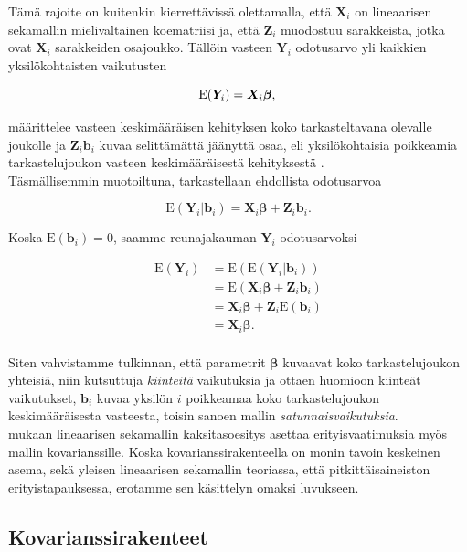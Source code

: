 \documentclass[finnish]{docopts}
\begin{document}
Tämä rajoite on kuitenkin kierrettävissä olettamalla, että $\bm{X}_i$ on lineaarisen sekamallin mielivaltainen koematriisi ja, että $\bm{Z}_i$ muodostuu sarakkeista, jotka ovat $\bm{X}_i$ sarakkeiden osajoukko. Tällöin vasteen $\bm{Y}_i$ odotusarvo yli kaikkien yksilökohtaisten vaikutusten

$$
\text{E}(\bm{Y}_i) = \bm{X}_i \bm{\beta}, \\
$$

määrittelee vasteen keskimääräisen kehityksen koko tarkasteltavana olevalle joukolle ja $\bm{Z}_i \bm{b}_i$ kuvaa selittämättä jäänyttä osaa, eli yksilökohtaisia poikkeamia tarkastelujoukon vasteen keskimääräisestä kehityksestä \cite{fitzmaurice11}. \\

Täsmällisemmin muotoiltuna, tarkastellaan ehdollista odotusarvoa

$$
\text{E}(\bm{Y}_i | \bm{b}_i) = \bm{X}_i \bm{\beta} + \bm{Z}_i \bm{b}_i.
$$

Koska $\text{E}(\bm{b}_i) = 0$, saamme reunajakauman $\bm{Y}_i$ odotusarvoksi

$$
\begin{aligned}
\text{E}(\bm{Y}_i) &=  \text{E}(\text{E}(\bm{Y}_i | \bm{b}_i)) \\
&=  \text{E}(\bm{X}_i \bm{\beta} + \bm{Z}_i \bm{b}_i) \\
&=  \bm{X}_i \bm{\beta} + \bm{Z}_i \text{E}(\bm{b}_i) \\
&=  \bm{X}_i \bm{\beta}. \\
\end{aligned}
$$

Siten vahvistamme tulkinnan, että parametrit $\bm{\beta}$ kuvaavat koko tarkastelujoukon yhteisiä, niin kutsuttuja \textit{kiinteitä} vaikutuksia ja ottaen huomioon kiinteät vaikutukset, $\bm{b}_i$ kuvaa yksilön $i$ poikkeamaa koko tarkastelujoukon keskimääräisesta vasteesta, toisin sanoen mallin \textit{satunnaisvaikutuksia}. \\

\cite{fitzmaurice11} mukaan lineaarisen sekamallin kaksitasoesitys asettaa erityisvaatimuksia myös mallin kovarianssille. Koska kovarianssirakenteella on monin tavoin keskeinen asema, sekä yleisen lineaarisen sekamallin teoriassa, että pitkittäisaineiston erityistapauksessa, erotamme sen käsittelyn omaksi luvukseen.\\ 

\subsection{Kovarianssirakenteet}
\label{sub:kovarianssirakenteet}
\end{document}
